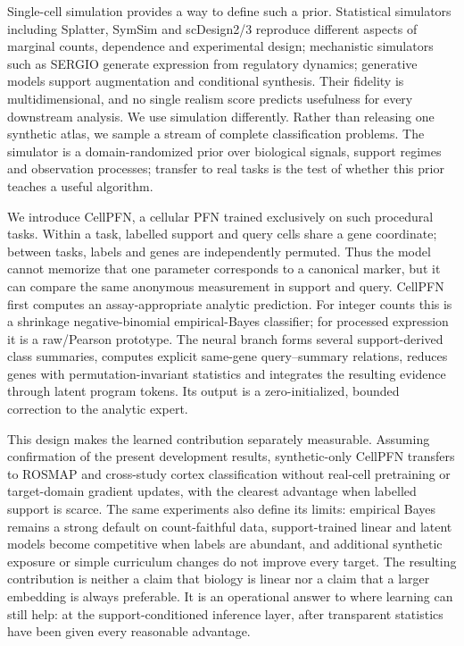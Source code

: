 \documentclass[12pt]{article}
\begin{document}
Single-cell simulation provides a way to define such a prior. Statistical simulators including Splatter, SymSim and scDesign2/3 reproduce different aspects of marginal counts, dependence and experimental design; mechanistic simulators such as SERGIO generate expression from regulatory dynamics; generative models support augmentation and conditional synthesis\cite{zappia2017splatter,zhang2019symsim,dibaeinia2020sergio,sun2021scdesign2,song2024scdesign3,marouf2020cscgan,luo2024scdiffusion}. Their fidelity is multidimensional, and no single realism score predicts usefulness for every downstream analysis\cite{crowell2023shaky,duo2024simulation}. We use simulation differently. Rather than releasing one synthetic atlas, we sample a stream of complete classification problems. The simulator is a domain-randomized prior over biological signals, support regimes and observation processes; transfer to real tasks is the test of whether this prior teaches a useful algorithm\cite{tobin2017domainrandomization,wood2021fake,flotho2025tfake}.

We introduce CellPFN, a cellular PFN trained exclusively on such procedural tasks. Within a task, labelled support and query cells share a gene coordinate; between tasks, labels and genes are independently permuted. Thus the model cannot memorize that one parameter corresponds to a canonical marker, but it can compare the same anonymous measurement in support and query. CellPFN first computes an assay-appropriate analytic prediction. For integer counts this is a shrinkage negative-binomial empirical-Bayes classifier; for processed expression it is a raw/Pearson prototype. The neural branch forms several support-derived class summaries, computes explicit same-gene query--summary relations, reduces genes with permutation-invariant statistics and integrates the resulting evidence through latent program tokens. Its output is a zero-initialized, bounded correction to the analytic expert.

This design makes the learned contribution separately measurable. Assuming confirmation of the present development results, synthetic-only CellPFN transfers to ROSMAP and cross-study cortex classification without real-cell pretraining or target-domain gradient updates, with the clearest advantage when labelled support is scarce. The same experiments also define its limits: empirical Bayes remains a strong default on count-faithful data, support-trained linear and latent models become competitive when labels are abundant, and additional synthetic exposure or simple curriculum changes do not improve every target. The resulting contribution is neither a claim that biology is linear nor a claim that a larger embedding is always preferable. It is an operational answer to where learning can still help: at the support-conditioned inference layer, after transparent statistics have been given every reasonable advantage.
\end{document}
